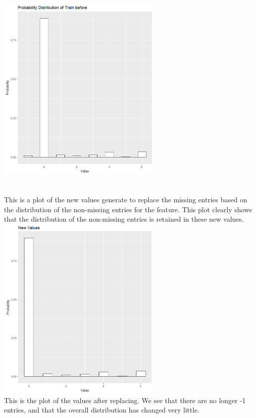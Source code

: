 \documentclass[fleqn,10pt]{SelfArx} %
\begin{document}
\includegraphics[width=8cm, height=10cm]{ex_before} \\
\\
This is a plot of the new values generate to replace the missing entries based on the distribution of the non-missing entries for the feature. This plot clearly shows that the distribution of the non-missing entries is retained in these new values.\\
\includegraphics[width=8cm, height=9cm]{ex_new} \\
\newpage
This is the plot of the values after replacing. We see that there are no longer -1 entries, and that the overall distribution has changed very little.\\
\end{document}
